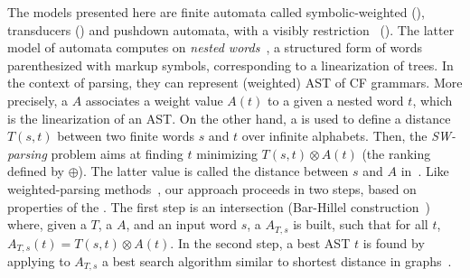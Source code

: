 %
%
The models presented here are finite automata called symbolic-weighted (\SWA),
transducers (\SWT) and pushdown automata,
with a visibly restriction~\cite{AlurMadhusudan09nested} (\SWVPA).
The latter model of automata computes on \emph{nested words}~\cite{AlurMadhusudan09nested}, 
a structured form of words parenthesized with markup symbols, 
corresponding to a linearization of trees.
In the context of parsing, they can represent (weighted) AST of CF grammars.
More precisely, a \SWVPA $A$ associates a weight value $A(t)$ %
to a given a nested word $t$, which is the linearization of an AST. %
%
On the other hand, 
a \SWT is used to define a distance $T(s, t)$ between two finite words $s$ and $t$
over infinite alphabets. %
Then, the \emph{SW-parsing} problem aims at %
finding $t$ minimizing 
$T(s, t) \otimes A(t)$ (\wrt the ranking defined by $\oplus$).
The latter value is called the distance between $s$ and $A$ in~\cite{Mohri03EDWA}.
%
Like weighted-parsing 
methods~\cite{Goodman99SemiringParsing,Nederhof03weightedParsing,MorbitzVogler19weighted-parsing}, 
our approach proceeds in two steps, 
based on properties of the \swM. 
The first step is an intersection 
(Bar-Hillel construction~\cite{GruneJacobs08parsing}) 
where, given a \SWT $T$, a \SWVPA $A$, and an input word $s$, 
a \SWVPA $A_{T, s}$ is built, such that for all $t$, $A_{T, s}(t) = T(s, t) \otimes A(t)$.
In the second step, a best AST $t$ is found by applying to $A_{T, s}$ 
a best search algorithm similar to shortest distance in graphs~\cite{Mohri02semiring,Huang05kbest}.
%

